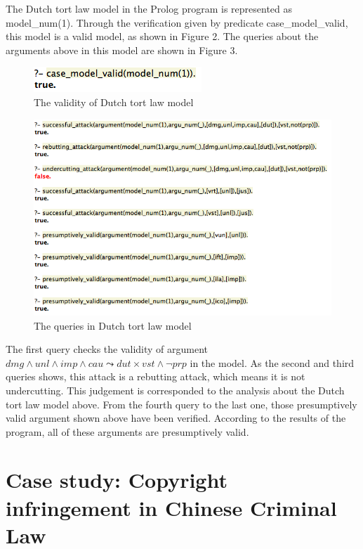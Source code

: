 \documentclass{IOS-Book-Article}
\begin{document}
The Dutch tort law model in the Prolog program is represented as {\mf model\_num(1)}. Through the verification given by predicate {\mf case\_model\_valid}, this model is a valid model, as shown in Figure 2. The queries about the arguments above in this model are shown in Figure 3.

\begin{figure} [htbp]
\centering
\includegraphics [scale=0.5] {model1.png}
\caption{The validity of Dutch tort law model}
\end{figure}

\begin{figure} [htbp]
\centering
\includegraphics [scale=0.5] {ex_tort.png}
\caption{The queries in Dutch tort law model}
\end{figure}

The first query checks the validity of argument $dmg \wedge unl \wedge imp \wedge cau \leadsto dut \times vst \wedge \neg prp$ in the model. As the second and third queries shows, this attack is a rebutting attack, which means it is not undercutting. This judgement is corresponded to the analysis about the Dutch tort law model above. From the fourth query to the last one, those presumptively valid argument shown above have been verified. According to the results of the program, all of these arguments are presumptively valid.

\section{Case study: Copyright infringement in Chinese Criminal Law}
\end{document}
